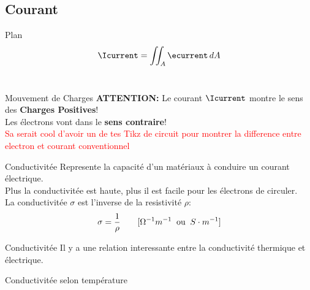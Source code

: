 \subsection[2min - Max]{Courant}
\maxbackground
\begin{frame}{Plan}
    \begin{equation}
        \Icurrent = \iint_A \ecurrent \,dA
    \end{equation}\\
    \vspace{20pt}
\end{frame}


\begin{frame}{Mouvement de Charges}
    \centering
    \icon[green]{\faExclamationTriangle} \textbf{ATTENTION:} Le courant $\Icurrent$ montre le sens des \textbf{Charges Positives}!\\
    Les électrons vont dans le \textbf{sens contraire}!\\
    \vspace{20pt}
    \textcolor{red}{Sa serait cool d'avoir un de tes Tikz de circuit pour montrer la difference entre electron et courant conventionnel}
\end{frame}

\begin{frame}{Conductivitée}
    \centering
    \icon[green]{\faExchange*} Represente la capacité d'un matériaux à conduire un courant électrique.\\
    Plus la conductivitée est haute, plus il est facile pour les électrons de circuler.\\
    \vspace{30pt}
    La conductivitée \textbf{$\sigma$} est l'inverse de la resistivité \textbf{$\rho$}:
    \begin{equation}
        \sigma = \frac{1}{\rho} \hspace{2.0em} [\Omega^{-1} m^{-1} \;\;\text{ou}\;\; S\cdot m^{-1}]
    \end{equation}
\end{frame}

\begin{frame}{Conductivitée}
    \centering
    \icon[red]{\faThermometerThreeQuarters} Il y a une relation interessante entre la conductivité thermique et électrique.
\end{frame}

\begin{frame}{Conductivitée selon température}
\end{frame}

